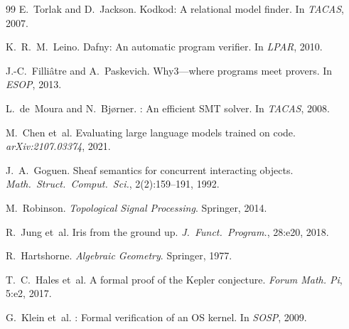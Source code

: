 \documentclass[11pt]{article}
\begin{document}
\begin{thebibliography}{99}
E.~Torlak and D.~Jackson.
\newblock Kodkod: A relational model finder.
\newblock In \emph{TACAS}, 2007.

K.~R.~M.~Leino.
\newblock Dafny: An automatic program verifier.
\newblock In \emph{LPAR}, 2010.

J.-C.~Filli\^{a}tre and A.~Paskevich.
\newblock Why3---where programs meet provers.
\newblock In \emph{ESOP}, 2013.

L.~de~Moura and N.~Bj{\o}rner.
: An efficient {SMT} solver.
\newblock In \emph{TACAS}, 2008.

M.~Chen et~al.
\newblock Evaluating large language models trained on code.
\newblock \emph{arXiv:2107.03374}, 2021.

J.~A.~Goguen.
\newblock Sheaf semantics for concurrent interacting objects.
\newblock \emph{Math.~Struct.~Comput.~Sci.}, 2(2):159--191, 1992.

M.~Robinson.
\newblock \emph{Topological Signal Processing}.
\newblock Springer, 2014.

R.~Jung et~al.
\newblock Iris from the ground up.
\newblock \emph{J.~Funct.~Program.}, 28:e20, 2018.

R.~Hartshorne.
\newblock \emph{Algebraic Geometry}.
\newblock Springer, 1977.

T.~C.~Hales et~al.
\newblock A formal proof of the {K}epler conjecture.
\newblock \emph{Forum Math. Pi}, 5:e2, 2017.

G.~Klein et~al.
: Formal verification of an {OS} kernel.
\newblock In \emph{SOSP}, 2009.

\end{thebibliography}
\end{document}
